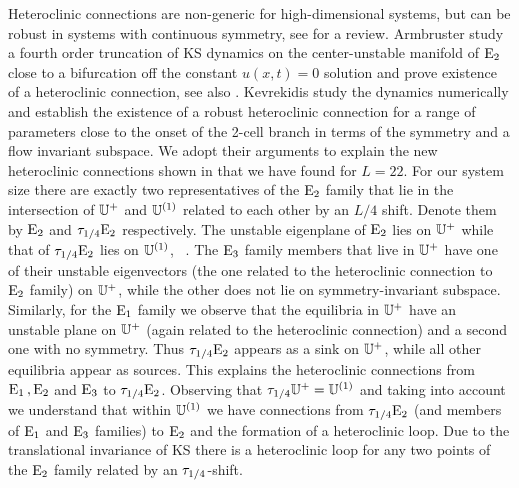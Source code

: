 Heteroclinic connections are non-generic for high-dimensional
systems, but can be robust in systems with continuous
symmetry, see  for a review.
Armbruster \etal{} study a fourth order truncation
of KS dynamics on the center-unstable manifold of $\mathrm{E}_{2}$
close to a bifurcation off the constant $u(x,t)=0$ solution
and prove existence of a heteroclinic connection, see also
. Kevrekidis \etal{} study the
dynamics numerically and establish the existence of a robust
heteroclinic connection for a range of parameters close to
the onset of the 2-cell branch in terms of the symmetry and a
flow invariant subspace. We adopt their arguments to explain
the new heteroclinic connections
shown in  that
we have found for $L=22$.
For our system size there are exactly two representatives of
the $\mathrm{E}_{2}$ family that lie in the intersection of $\mathbb{U}^+$
and $\mathbb{U}^{(1)}$ related to each other by an $L/4$ shift.
Denote them by $\mathrm{E}_{2}$ and $\tau_{1/4}\mathrm{E}_{2}$
respectively. The unstable eigenplane of $\mathrm{E}_{2}$ lies on
$\mathbb{U}^+$ while that of $\tau_{1/4}\mathrm{E}_{2}$ lies on
$\mathbb{U}^{(1)}$, \cf\ . The $\mathrm{E}_{3}$ family
members that live in $\mathbb{U}^+$ have one of their unstable
eigenvectors (the one related to the heteroclinic connection
to $\mathrm{E}_{2}$ family)  on $\mathbb{U}^+$, while the other does not
lie on symmetry-invariant subspace. Similarly, for the
$\mathrm{E}_{1}$ family we observe that the equilibria in $\mathbb{U}^+$
have an unstable plane on $\mathbb{U}^+$ (again related to the
heteroclinic connection) and a second one with no symmetry.
Thus $\tau_{1/4}\mathrm{E}_{2}$ appears as a sink on $\mathbb{U}^+$,
while all other equilibria appear as sources. This explains
the heteroclinic connections from $\mathrm{E}_{1}\,,\mathrm{E}_{2}$ and
$\mathrm{E}_{3}$ to $\tau_{1/4}\mathrm{E}_{2}$. Observing that
$\tau_{1/4} \mathbb{U}^+= \mathbb{U}^{(1)}$ and taking into account
 we understand that within $\mathbb{U}^{(1)}$ we
have connections from $\tau_{1/4}\mathrm{E}_{2}$ (and members of
$\mathrm{E}_{1}$ and $\mathrm{E}_{3}$ families) to $\mathrm{E}_{2}$ and the
formation of a heteroclinic loop. Due to the translational
invariance of KS there is a heteroclinic loop for any two
points of the $\mathrm{E}_{2}$ family related by an $\tau_{1/4}$-shift.

